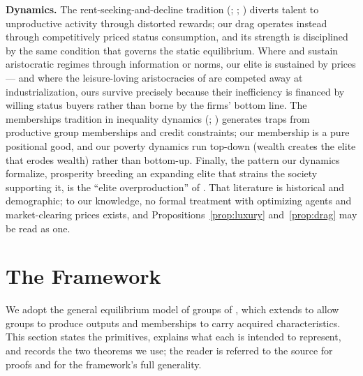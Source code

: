 \documentclass[12pt,letterpaper]{article}
\theoremstyle{definition}
\begin{document}
\textbf{Dynamics.}
The rent-seeking-and-decline tradition (\citealt{murphyshleifervishny1991}; \citealt{baumol1990entrepreneurship}; \citealt{acemoglu1995reward}) diverts talent to unproductive activity through distorted rewards; our drag operates instead through competitively priced status consumption, and its strength is disciplined by the same condition that governs the static equilibrium.
Where \citet{hasslermora2000} and \citet{colemailathpostlewaite1992} sustain aristocratic regimes through information or norms, our elite is sustained by prices --- and where the leisure-loving aristocracies of \citet{doepkezilibotti2008} are competed away at industrialization, ours survive precisely because their inefficiency is financed by willing status buyers rather than borne by the firms' bottom line.
The memberships tradition in inequality dynamics (\citealt{durlauf1996persistent}; \citealt{galorzeira1993}) generates traps from productive group memberships and credit constraints; our membership is a pure positional good, and our poverty dynamics run top-down (wealth creates the elite that erodes wealth) rather than bottom-up.
Finally, the pattern our dynamics formalize, prosperity breeding an expanding elite that strains the society supporting it, is the ``elite overproduction'' of \citet{turchin2023endtimes}.
That literature is historical and demographic; to our knowledge, no formal treatment with optimizing agents and market-clearing prices exists, and Propositions~\ref{prop:luxury} and~\ref{prop:drag} may be read as one.

\section{The Framework}\label{sec:framework}

We adopt the general equilibrium model of groups of \citet{ellickson2006organization}, which extends \citet{ellickson1999clubs} to allow groups to produce outputs and memberships to carry acquired characteristics.
This section states the primitives, explains what each is intended to represent, and records the two theorems we use; the reader is referred to the source for proofs and for the framework's full generality.
\end{document}
